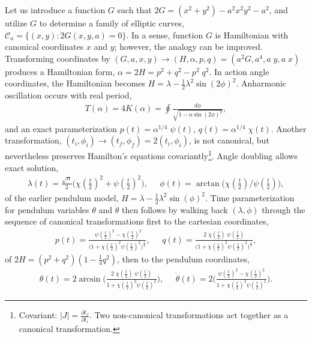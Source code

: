 \documentclass[nofootinbib,preprint]{revtex4-1}
\begin{document}
Let us introduce a function $G$ such that $2G=(x^2+y^2)-a^2 x^2 y^2-a^2$,
and utilize $G$ to determine a family of elliptic curves, 
$\mathcal{C}_a=\{(x,y):2G(x,y,a)=0\}$. In a sense, function $G$ is Hamiltonian 
with canonical coordinates $x$ and $y$; however, the analogy can be improved. 
Transforming coordinates by  $(G,a,x,y) \rightarrow (H,\alpha,p,q)=(a^2 G,a^4,a\;y,a\;x)$ 
produces a Hamiltonian form, $\alpha=2H=p^2+q^2 - p^2 \; q^2$. In action angle 
coordinates, the Hamiltonian becomes $H = \lambda-\frac{1}{2}\lambda^2\sin(2\phi)^2$. 
Anharmonic oscillation occurs with real period, 
\begin{eqnarray}
T(\alpha) = 4K(\alpha) = \oint \frac{d\phi}{\sqrt{1-\alpha\sin(2\phi)^2}},\nonumber
\end{eqnarray}
and an exact parameterization $p(t)=\alpha^{1/4} \;\psi(t)$, $q(t)=\alpha^{1/4} \;\chi(t)$. 
Another transformation, $(t_i,\phi_i)\rightarrow (t_f,\phi_f)=2(t_i,\phi_i)$, is not
canonical, but nevertheless preserves Hamilton's equations  covariantly\footnote{Covariant: 
$|J|=\frac{\partial t_f}{\partial t_i}$. Two non-canonical transformations act together as 
a canonical transformation.}. Angle doubling allows exact solution, 
\begin{eqnarray}
\lambda(t) = \frac{\sqrt{\alpha}}{2}\Big(\chi(\tfrac{t}{2})^2 + \psi(\tfrac{t}{2})^2\Big), \;\;\;\;\; 
\phi(t)   =  \arctan\big(\chi(\tfrac{t}{2})/\psi(\tfrac{t}{2})\big),  \nonumber 
\end{eqnarray}
of the earlier pendulum model, $H = \lambda-\frac{1}{2}\lambda^2\sin(\phi)^2$.
Time parameterization for pendulum variables $\theta$ and $\dot{\theta}$ then follows by 
walking back $(\lambda,\phi)$ through the sequence of canonical transformations\textemdash 
first to the cartesian coordinates,
\begin{eqnarray}
p(t)   =  \frac{ \; \psi(\tfrac{t}{2})^2-\chi(\tfrac{t}{2})^2 
}{\Big(1+\chi(\tfrac{t}{2})^2  \psi(\tfrac{t}{2})^2\Big)^{\frac{1}{2}}},  \;\;\;\;\; 
q(t)  = \frac{2 \;  \chi(\tfrac{t}{2})\;\psi(\tfrac{t}{2}) 
}{\Big(1+\chi(\tfrac{t}{2})^2 \psi(\tfrac{t}{2})^2\Big)^{\frac{1}{2}}}, \nonumber 
\end{eqnarray}
of $2H=(p^2+q^2)(1-\frac{1}{4}q^2)$, then to the pendulum coordinates,
\begin{eqnarray}
\theta(t) = 2 \arcsin\bigg(\frac{2\;\chi(\tfrac{t}{2})\; \psi(\tfrac{t}{2})
}{1+\chi(\tfrac{t}{2})^2 \psi(\tfrac{t}{2})^2 }\bigg), \;\;\;\;\; 
\dot{\theta}(t) = 2\bigg(\frac{\psi(\tfrac{t}{2})^2 - \chi(\tfrac{t}{2})^2
}{1+\chi(\tfrac{t}{2})^2 \psi(\tfrac{t}{2})^2 }\bigg). \nonumber 
\end{eqnarray}
\end{document}

